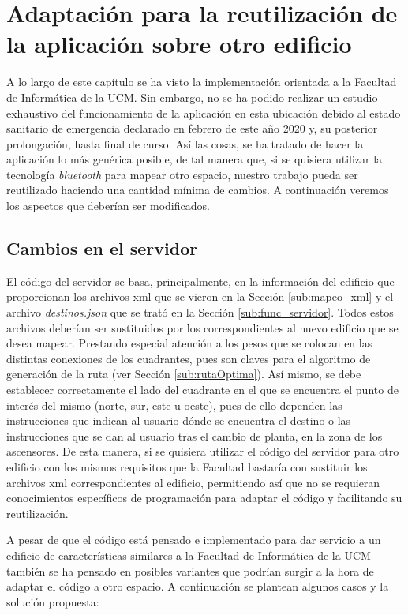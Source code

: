 \section{Adaptación para la reutilización de la aplicación sobre otro edificio}

A lo largo de este capítulo se ha visto la implementación orientada a la Facultad de Informática de la UCM. Sin embargo, no se ha podido realizar un estudio exhaustivo del funcionamiento de la aplicación en esta ubicación debido al estado sanitario de emergencia declarado en febrero de este año 2020 y, su posterior prolongación, hasta final de curso. Así las cosas, se ha tratado de hacer la aplicación lo más genérica posible, de tal manera que, si se quisiera utilizar la tecnología \textit{bluetooth} para mapear otro espacio, nuestro trabajo pueda ser reutilizado haciendo una cantidad mínima de cambios. A continuación veremos los aspectos que deberían ser modificados.

\subsection{Cambios en el servidor}

El código del servidor se basa, principalmente, en la información del edificio que proporcionan los archivos xml que se vieron en la Sección \ref{sub:mapeo_xml} y el archivo \textit{destinos.json} que se trató en la Sección \ref{sub:func_servidor}. Todos estos archivos deberían ser sustituidos por los correspondientes al nuevo edificio que se desea mapear. Prestando especial atención a los pesos que se colocan en las distintas conexiones de los cuadrantes, pues son claves para el algoritmo de generación de la ruta (ver Sección \ref{sub:rutaOptima}). Así mismo, se debe establecer correctamente el lado del cuadrante en el que se encuentra el punto de interés del mismo (norte, sur, este u oeste), pues de ello dependen las instrucciones que indican al usuario dónde se encuentra el destino o las instrucciones que se dan al usuario tras el cambio de planta, en la zona de los ascensores. De esta manera, si se quisiera utilizar el código del servidor para otro edificio con los mismos requisitos que la Facultad bastaría con sustituir los archivos xml correspondientes al edificio, permitiendo así que no se requieran conocimientos específicos de programación para adaptar el código y facilitando su reutilización.

A pesar de que el código está pensado e implementado para dar servicio a un edificio de características similares a la Facultad de Informática de la UCM también se ha pensado en posibles variantes que podrían surgir a la hora de adaptar el código a otro espacio. A continuación se plantean algunos casos y la solución propuesta: 

